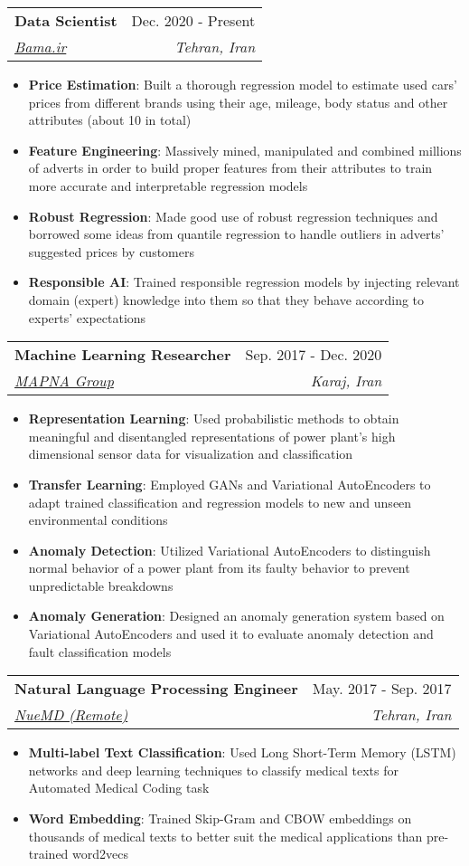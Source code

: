 \documentclass[letterpaper,11pt]{article}
\makeatletter
\newcommand{\resumeItem}[2]{
  \item\small{
    \textbf{#1}{: #2 \vspace{-2pt}}
  }
}
\newcommand{\resumeSubheading}[4]{
  \vspace{-1pt}\item
    \begin{tabular*}{0.97\textwidth}[t]{l@{\extracolsep{\fill}}r}
      \textbf{#1} & #2 \\
      \textit{\small#3} & \textit{\small #4} \\
    \end{tabular*}\vspace{-5pt}
}
\newcommand{\resumeItemListStart}{\begin{itemize}}
\newcommand{\resumeItemListEnd}{\end{itemize}\vspace{-5pt}}
\makeatother
\begin{document}
    \resumeSubheading
      {Data Scientist}{Dec. 2020 - Present}
      {\href{https://bama.ir}{Bama.ir}}{Tehran, Iran}
      \resumeItemListStart
        \resumeItem{Price Estimation}
          {Built a thorough regression model to estimate used cars' prices from different brands using their age, mileage, body status and other attributes (about 10 in total)}
        \resumeItem{Feature Engineering}
          {Massively mined, manipulated and combined millions of adverts in order to build proper features from their attributes to train more accurate and interpretable regression models}
        \resumeItem{Robust Regression}
          {Made good use of robust regression techniques and borrowed some ideas from quantile regression to handle outliers in adverts' suggested prices by customers}
        \resumeItem{Responsible AI}
          {Trained responsible regression models by injecting relevant domain (expert) knowledge into them so that they behave according to experts' expectations}
      \resumeItemListEnd

    \resumeSubheading
      {Machine Learning Researcher}{Sep. 2017 - Dec. 2020}
      {\href{https://www.mapnagroup.com/en}{MAPNA Group}}{Karaj, Iran}
      \resumeItemListStart
        \resumeItem{Representation Learning}
          {Used probabilistic methods to obtain meaningful and disentangled representations of power plant's high dimensional sensor data for visualization and classification}
        \resumeItem{Transfer Learning}
          {Employed GANs and Variational AutoEncoders to adapt trained classification and regression models to new and unseen environmental conditions}
        \resumeItem{Anomaly Detection}
          {Utilized Variational AutoEncoders to distinguish normal behavior of a power plant from its faulty behavior to prevent unpredictable breakdowns}
        \resumeItem{Anomaly Generation}
          {Designed an anomaly generation system based on Variational AutoEncoders and used it to evaluate anomaly detection and fault classification models}                    
      \resumeItemListEnd

    \resumeSubheading
      {Natural Language Processing Engineer}{May. 2017 - Sep. 2017}
      {\href{https://nuemd.com/}{NueMD (Remote)}}{Tehran, Iran}
      \resumeItemListStart
        \resumeItem{Multi-label Text Classification}
          {Used Long Short-Term Memory (LSTM) networks and deep learning techniques to classify medical texts for Automated Medical Coding task}
        \resumeItem{Word Embedding}
          {Trained Skip-Gram and CBOW embeddings on thousands of medical texts to better suit the medical applications than pre-trained word2vecs}
      \resumeItemListEnd
\end{document}
